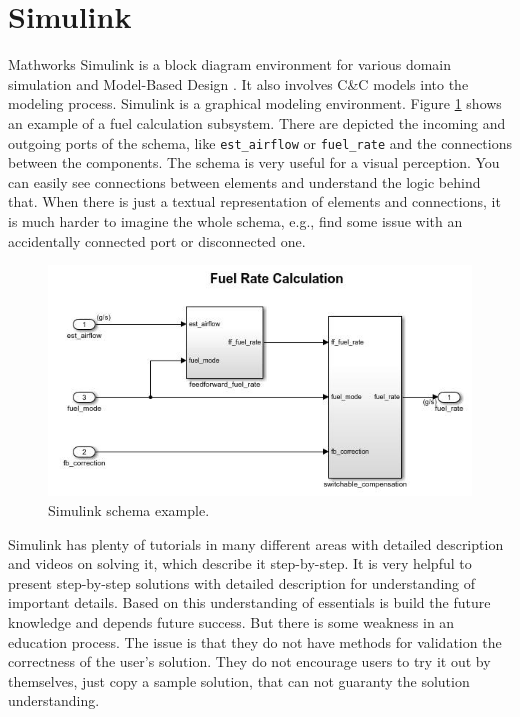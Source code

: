 \section{Simulink} \label{sec:simulink}
Mathworks Simulink \cite{Mathworks} is a block diagram environment for various domain simulation and Model-Based Design \cite{liebel2018model}. It also involves C\&C models into the modeling process. Simulink is a graphical modeling environment. Figure \ref{fig:simulink} shows an example of a fuel calculation subsystem. There are depicted the incoming and outgoing ports of the schema, like \texttt{est\_airflow} or \texttt{fuel\_rate} and the connections between the components. The schema is very useful for a visual perception. You can easily see connections between elements and understand the logic behind that. When there is just a textual representation of elements and connections, it is much harder to imagine the whole schema, e.g., find some issue with an accidentally connected port or disconnected one.
\begin{figure}[h!]
    \centering
    \includegraphics[width=0.7\linewidth]{src/pic/simulink}
    \caption{Simulink schema example.}
    \label{fig:simulink}
\end{figure}
Simulink has plenty of tutorials in many different areas with detailed description and videos on solving it, which describe it step-by-step. It is very helpful to present step-by-step solutions with detailed description for understanding of important details. Based on this understanding of essentials is build the future knowledge and depends future success. But there is some weakness in an education process. The issue is that they do not have methods for validation the correctness of the user's solution. They do not encourage users to try it out by themselves, just copy a sample solution, that can not guaranty the solution understanding.

